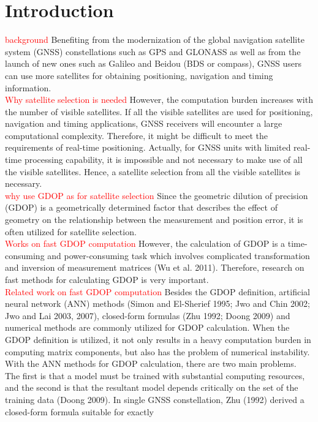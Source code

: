 \documentclass[a4paper]{report}
\begin{document}
\section{Introduction}
\textcolor{red}{background}
Benefiting from the modernization of the global navigation satellite system (GNSS) constellations such as GPS and GLONASS as well as from the launch of new ones such as
Galileo and Beidou (BDS or compass), GNSS users can use more satellites for obtaining positioning, navigation and timing information. \\
\textcolor{red}{Why satellite selection is needed}
However, the computation burden increases with the number of visible satellites. If all the
visible satellites are used for positioning, navigation and timing applications, GNSS receivers will encounter a large computational complexity. Therefore, it might be difficult to meet the requirements of real-time positioning. Actually, for GNSS units with limited real-time processing capability, it is impossible and not necessary to make use of all the visible satellites. Hence, a satellite selection from all the visible satellites is necessary.\\
\textcolor{red}{why use GDOP as for satellite selection}
Since the geometric dilution of precision (GDOP) is a geometrically determined factor that describes the effect of geometry on the relationship between the measurement and
position error, it is often utilized for satellite selection. \\
\textcolor{red}{Works on fast GDOP computation}
However, the calculation of GDOP is a time-consuming and power-consuming task which involves complicated transformation and inversion of measurement matrices (Wu et al. 2011). Therefore, research on fast methods for
calculating GDOP is very important.\\
\textcolor{red}{Related work on fast GDOP computation}
Besides the GDOP definition, artificial neural network (ANN) methods (Simon and El-Sherief 1995; Jwo and Chin 2002; Jwo and Lai 2003, 2007), closed-form formulas (Zhu 1992; Doong 2009) and numerical methods are commonly utilized for GDOP calculation. When the GDOP
definition is utilized, it not only results in a heavy computation
burden in computing matrix components, but also
has the problem of numerical instability. With the ANN
methods for GDOP calculation, there are two main problems.
The first is that a model must be trained with substantial
computing resources, and the second is that the
resultant model depends critically on the set of the training
data (Doong 2009).  In single GNSS constellation, Zhu (1992) derived a closed-form formula suitable for exactly
\end{document}
